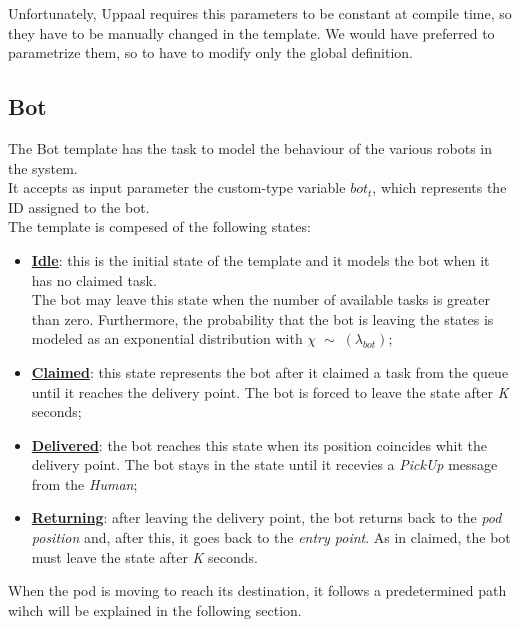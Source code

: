 \documentclass[10pt,a4paper]{article}
\begin{document}
			Unfortunately, Uppaal requires this parameters to be constant at compile time, so they have to be manually changed in the template. We would have preferred to parametrize them, so to have to modify only the global definition. 
			
		
		\subsection{Bot}
			The Bot template has the task to model the behaviour of the various robots in the system. \\
			It accepts as input parameter the custom-type variable $bot_t$, which represents the ID assigned to the bot.\\
			The template is compesed of the following states:
			\begin{itemize}
				\item \textbf{\underline{Idle}}: this is the initial state of the template and it models the bot when it has no claimed task.\\The bot may leave this state when the number of available tasks is greater than zero. Furthermore, the probability that the bot is leaving the states is modeled as an exponential distribution with $\chi\;\sim\;(\lambda_{bot})$;
				\item \textbf{\underline{Claimed}}: this state represents the bot after it claimed a task from the queue until it reaches the delivery point. The bot is forced to leave the state after \emph{K} seconds;
				\item \textbf{\underline{Delivered}}: the bot reaches this state when its position coincides whit the delivery point. The bot stays in the state until it recevies a \emph{PickUp} message from the \emph{Human};
				\item \textbf{\underline{Returning}}: after leaving the delivery point, the bot returns back to the \emph{pod position} and, after this, it goes back to the \emph{entry point}. As in claimed, the bot must leave the state after \emph{K} seconds.
			\end{itemize}
			When the pod is moving to reach its destination, it follows a predetermined path wihch will be explained in the following section.
\end{document}
